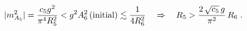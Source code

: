 \begin{equation}
\label{eq:initialmass}
|m_{A_5}^2| = \frac{c_5 g^2}{\pi^4 R_5^2} < g^2 A_6^2 \,({\rm
initial}) \lesssim \frac{1}{4R_6^2} \quad \Rightarrow \quad R_5 >
\frac{2\,\sqrt{c_5}\,g}{\pi^2}\, R_6 \; .
\end{equation}

